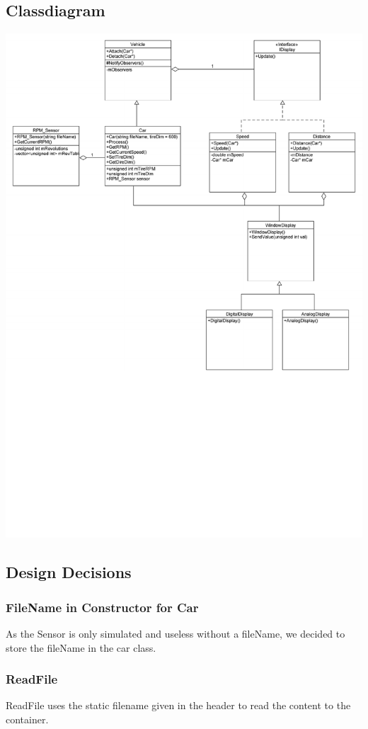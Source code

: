 \subsection{Classdiagram}
\includegraphics[scale=0.65]{ClassDiagramm1}

\subsection{Design Decisions}
\subsubsection{FileName in Constructor for Car}
As the Sensor is only simulated and useless without a fileName, we decided to store the fileName in the car class.

\subsubsection{ReadFile}
ReadFile uses the static filename given in the header to read the content to the container.


